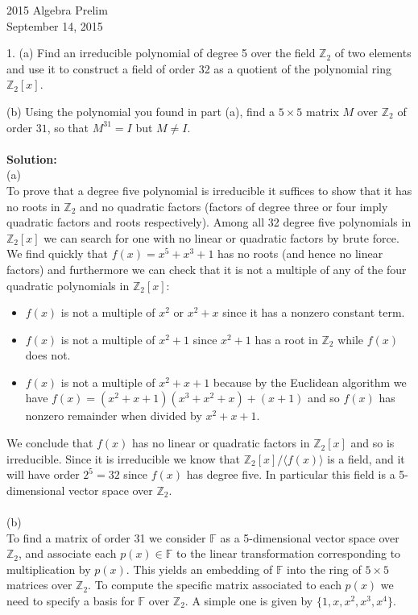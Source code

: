 \documentclass[11pt]{article}
\newcommand{\Z}{\mathbb{Z}}
\newcommand{\F}{\mathbb{F}}
\begin{document}
\begin{center}
\Large 2015 Algebra Prelim\\
\normalsize September 14, 2015
\end{center}
\vspace{1em}


1. (a) Find an irreducible polynomial of degree 5 over the field $\Z_2$ of two elements
and use it to construct a field of order 32 as a quotient of the polynomial ring $\Z_2[x]$.

(b) Using the polynomial you found in part (a), find a $5\times 5$ matrix $M$ over $\Z_2$
of order $31$, so that $M^{31} = I$ but $M \neq I$.\\\\
\textbf{Solution:} \\
(a)\\
To prove that a degree five polynomial is irreducible it suffices to show that it has no roots in $\Z_2$ and no quadratic factors (factors of degree three or four imply quadratic factors and roots respectively). Among all 32 degree five polynomials in $\Z_2[x]$ we can search for one with no linear or quadratic factors by brute force. We find quickly that $f(x) = x^5+x^3+1$ has no roots (and hence no linear factors) and furthermore we can check that it is not a multiple of any of the four quadratic polynomials in $\Z_2[x]$:\begin{itemize}
\item $f(x)$ is not a multiple of $x^2$ or $x^2+x$ since it has a nonzero constant term.
\item $f(x)$ is not a multiple of $x^2+1$ since $x^2+1$ has a root in $\Z_2$ while $f(x)$ does not.
\item $f(x)$ is not a multiple of $x^2+x+1$ because by the Euclidean algorithm we have $f(x) = (x^2+x+1)(x^3+x^2+x) + (x+1)$ and so $f(x)$ has nonzero remainder when divided by $x^2+x+1$. 
\end{itemize}
We conclude that $f(x)$ has no linear or quadratic factors in $\Z_2[x]$ and so is irreducible. Since it is irreducible we know that $\Z_2[x]/\langle f(x)\rangle$ is a field, and it will have order $2^5 = 32$ since $f(x)$ has degree five. In particular this field is a 5-dimensional vector space over $\Z_2$.\\\\
(b)\\
 To find a matrix of order 31 we consider $\F$ as a 5-dimensional vector space over $\Z_2$, and associate each $p(x)\in \F$ to the linear transformation corresponding to multiplication by $p(x)$. This yields an embedding of $\F$ into the ring of $5\times 5$ matrices over $\Z_2$. To compute the specific matrix associated to each $p(x)$ we need to specify a basis for $\F$ over $\Z_2$. A simple one is given by $\{1,x,x^2,x^3,x^4\}$. 
\end{document}
